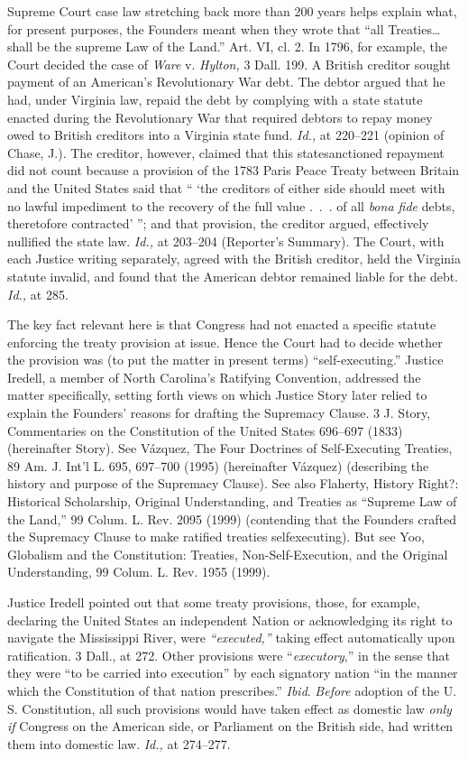 {  Supreme Court case law stretching back more than 200 years helps
explain what, for present purposes, the Founders meant when they wrote
that ``all Treaties\dots shall be the supreme Law of the Land.''
Art. VI, cl. 2. In 1796, for example, the Court decided the case
of \emph{Ware} v. \emph{Hylton,} 3 Dall. 199. A British creditor sought
payment of an American's Revolutionary War debt. The debtor argued
that he had, under Virginia law, repaid the debt by complying with a
state statute enacted during the Revolutionary War that \newpage  required
debtors to repay money owed to British creditors into a Virginia state
fund. \emph{Id.,} at 220--221 (opinion of Chase, J.). The creditor,
however, claimed that this statesanctioned repayment did not count
because a provision of the 1783 Paris Peace Treaty between Britain and
the United States said that `` ‘the creditors of either side should
meet with no lawful impediment to the recovery of the full value .~.~.
of all \emph{bona fide} debts, theretofore contracted' ''; and that
provision, the creditor argued, effectively nullified the state law.
\emph{Id.,} at 203--204 (Reporter's Summary). The Court, with each
Justice writing separately, agreed with the British creditor, held the
Virginia statute invalid, and found that the American debtor remained
liable for the debt. \emph{Id.,} at 285.

  The key fact relevant here is that Congress had not enacted a specific
statute enforcing the treaty provision at issue. Hence the Court had to
decide whether the provision was (to put the matter in present terms)
``self-executing.'' Justice Iredell, a member of North Carolina's
Ratifying Convention, addressed the matter specifically, setting forth
views on which Justice Story later relied to explain the Founders'
reasons for drafting the Supremacy Clause. 3 J. Story, Commentaries
on the Constitution of the United States 696--697 (1833) (hereinafter
Story). See Vázquez, The Four Doctrines of Self-Executing Treaties,
\textsc{89} Am. J. Int'l L. \textsc{695, 697--700} (1995) (hereinafter
Vázquez) (describing the history and purpose of the Supremacy Clause).
See also Flaherty, History Right?: Historical Scholarship, Original
Understanding, and Treaties as ``Supreme Law of the Land,'' 99 Colum.
L. Rev. 2095 (1999) (contending that the Founders crafted the Supremacy
Clause to make ratified treaties selfexecuting). But see Yoo, Globalism
and the Constitution: Treaties, Non-Self-Execution, and the Original
Understanding, 99 Colum. L. Rev. 1955 (1999).

  Justice Iredell pointed out that some treaty provisions, those, for
example, declaring the United States an independ\newpage ent Nation
or acknowledging its right to navigate the Mississippi River, were
\emph{``executed,''} taking effect automatically upon ratification.
3 Dall., at 272. Other provisions were ``\emph{executory},'' in
the sense that they were ``to be carried into execution'' by each
signatory nation ``in the manner which the Constitution of that
nation prescribes.'' \emph{Ibid}. \emph{Before} adoption of the U. S.
Constitution, all such provisions would have taken effect as domestic
law \emph{only if} Congress on the American side, or Parliament on the
British side, had written them into domestic law. \emph{Id.,} at
274--277.

}
